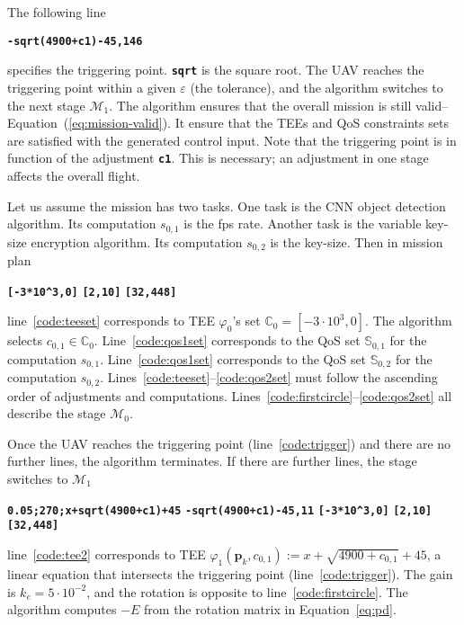 \documentclass[letterpaper,10pt,conference]{ieeeconf}
\theoremstyle{definition}
\begin{document}
The following line
\begin{algorithmic}[1]
  \State\textbf{\texttt{-sqrt(4900+c1)-45,146}}\label{code:trigger}
\end{algorithmic}
specifies the triggering point. {\tt\textbf{sqrt}} is the square root. The UAV reaches the triggering point within a given $\varepsilon$ (the tolerance), and the algorithm switches to the next stage $\mathcal{M}_1$. The algorithm ensures that the overall mission is still valid--Equation~(\ref{eq:mission-valid}). It ensure that the TEEs and QoS constraints sets are satisfied with the generated control input. Note that the triggering point is in function of the adjustment {\tt\textbf{c1}}. This is necessary; an adjustment in one stage affects the overall flight.

Let us assume the mission has two tasks. One task is the CNN object detection algorithm. Its computation $s_{0,1}$ is the fps rate. Another task is the variable key-size encryption algorithm. Its computation $s_{0,2}$ is the key-size. Then in mission plan
\begin{algorithmic}[1]
  \State\textbf{\texttt{[-3*10\^{}3,0]}}\label{code:teeset}
  \State\textbf{\texttt{[2,10]}}\label{code:qos1set}
  \State\textbf{\texttt{[32,448]}}\label{code:qos2set}
\end{algorithmic}
line~\ref{code:teeset} corresponds to TEE $\varphi_0$'s set $\mathbb{C}_0=[-3\cdot10^3,0]$. The algorithm selects $c_{0,1}\in\mathbb{C}_0$. Line~\ref{code:qos1set} corresponds to the QoS set $\mathbb{S}_{0,1}$ for the computation $s_{0,1}$. Line~\ref{code:qos1set} corresponds to the QoS set $\mathbb{S}_{0,2}$ for the computation $s_{0,2}$. Lines~\ref{code:teeset}--\ref{code:qos2set} must follow the ascending order of adjustments and computations. Lines~\ref{code:firstcircle}--\ref{code:qos2set} all describe the stage $\mathcal{M}_0$.

Once the UAV reaches the triggering point (line~\ref{code:trigger}) and there are no further lines, the algorithm terminates. If there are further lines, the stage switches to $\mathcal{M}_1$
\begin{algorithmic}[1]
  \State\textbf{\texttt{0.05;270;x+sqrt(4900+c1)+45}}\label{code:tee2}
  \State\textbf{\texttt{-sqrt(4900+c1)-45,11}}\label{code:trigger2}
  \State\textbf{\texttt{[-3*10\^{}3,0]}}\label{code:teeset2}
  \State\textbf{\texttt{[2,10]}}
  \State\textbf{\texttt{[32,448]}}\label{code:qosset12}
\end{algorithmic}
line~\ref{code:tee2} corresponds to TEE $\varphi_1(\mathbf{p}_k,c_{0,1}):=x+\sqrt{4900+c_{0,1}}+45$, a linear equation that intersects the triggering point (line~\ref{code:trigger}). The gain is $k_e=5\cdot 10^{-2}$, and the rotation is opposite to line~\ref{code:firstcircle}. The algorithm computes $-E$ from the rotation matrix in Equation~\ref{eq:pd}. 
\end{document}
